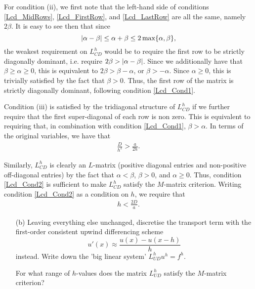 \begin{problem}{1}
\begin{solution}
For condition (ii), we first note that the left-hand side of conditions
\ref{Lcd_MidRows}, \ref{Lcd_FirstRow}, and \ref{Lcd_LastRow} are all
the same, namely $2\beta$. It is easy to see then that since
$$\abs{\alpha - \beta} \leq \alpha + \beta \leq 2\max\{\alpha,\beta\},$$
the weakest requirement on $L^h_{CD}$ would be to require the first
row to be strictly diagonally dominant, i.e. require
$2\beta > \left| \alpha - \beta \right|$. Since we additionally have that
$\beta \geq \alpha \geq 0$, this is equivalent to 
$2\beta > \beta - \alpha$, or
$\beta > -\alpha$. Since $\alpha \geq 0$, this is trivially satisfied
by the fact that $\beta > 0$. Thus, the first row of the matrix is
strictly diagonally dominant, following condition \ref{Lcd_Cond1}.

Condition (iii) is satisfied by the tridiagonal structure of $L^h_{CD}$ 
if we further require that the first
super-diagonal of each row is non zero. This is equivalent to 
requiring that, in combination with condition \ref{Lcd_Cond1},
$\beta > \alpha$.
In terms of the original variables, we have that
\begin{align}\label{Lcd_Cond2}
    \boxed{\frac{D}{h^2} > \frac{a}{2h}}.
\end{align}

Similarly, $L^h_{CD}$ is clearly an $L$-matrix (positive diagonal
entries and non-positive off-diagonal entries) by the fact that
$\alpha < \beta$, $\beta > 0$, and $\alpha \geq 0$. Thus, condition
\ref{Lcd_Cond2} is sufficient to make $L^h_{CD}$ satisfy the $M$-matrix
criterion. Writing condition \ref{Lcd_Cond2} as a condition on $h$,
we require that
\begin{align}\label{Lcd_h_Cond}
    \boxed{ h < \frac{2D}{a}}.
\end{align}

\end{solution}
\pagebreak

\begin{itemize}
	\item[(b)] Leaving everything else unchanged, discretise the 
	transport term with the first-order consistent upwind differencing
	scheme
	$$u'(x) \approx \frac{u(x)-u(x-h)}{h}$$
	instead. Write down the 'big linear system' $L^h_{UD}u^h=f^h$.
	
	For what range of $h$-values does the matrix $L^h_{UD}$
	satisfy the $M$-matrix criterion?
\end{itemize}


\end{problem}
